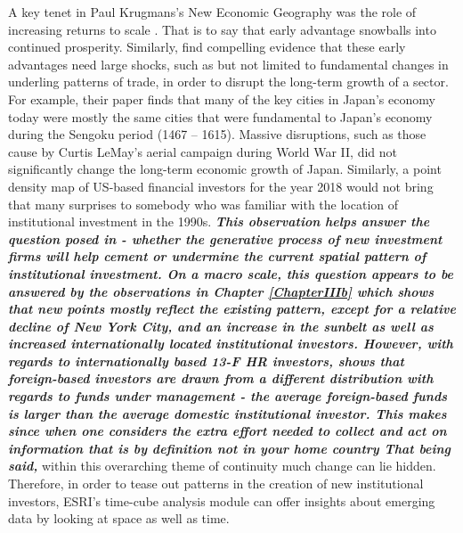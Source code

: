 A key tenet in Paul Krugmans's New Economic Geography was the role of increasing returns to scale \citep{krugman1991increasing}.  That is to say that early advantage snowballs into continued prosperity.  Similarly, \cite{davis2002bones} find compelling evidence that these early advantages need large shocks, such as but not limited to fundamental changes in underling patterns of trade, in order to disrupt the long-term growth of a sector.  For example, their paper finds that many of the key cities in Japan's economy today were mostly the same cities that were fundamental to Japan's economy during the Sengoku period (1467 -- 1615).  Massive disruptions, such as those cause by Curtis LeMay's aerial campaign during World War II, did not significantly change the long-term economic growth of Japan.  Similarly, a point density map of US-based financial investors for the year 2018 would not bring that many surprises to somebody who was familiar with the location of institutional investment in the 1990s.  \textbf{\textit{This observation helps answer the question posed in \cite{GreenOLef2014} - whether the generative process of new investment firms will help cement or undermine the current spatial pattern of institutional investment.  On a macro scale, this question appears to be answered by the observations in Chapter \ref{ChapterIIIb} which shows that new points mostly reflect the existing pattern, except for a relative decline of New York City, and an increase in the sunbelt as well as increased internationally located institutional investors.  However, with regards to internationally based 13-F HR investors, \cite{Lefebvre2014} shows that foreign-based investors are drawn from a different distribution with regards to funds under management - the average foreign-based funds is larger than the average domestic institutional investor.  This makes since when one considers the extra effort needed to collect and act on information that is by definition not in your home country \citep{malloythe2005} That being said,}} within this overarching theme of continuity much change can lie hidden.  Therefore, in order to tease out patterns in the creation of new institutional investors, ESRI's time-cube analysis module can offer insights about emerging data by looking at space as well as time. 


